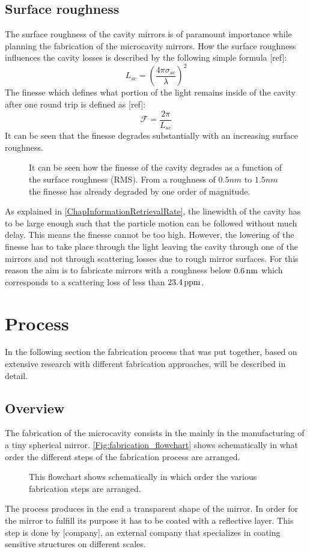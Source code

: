 \subsection{Surface roughness}
The surface roughness of the cavity mirrors is of paramount importance while planning the fabrication of the microcavity mirrors. How the surface roughness influences the cavity losses is described by the following simple formula [ref]:
\begin{equation}
	L_{\si{sc}}=\left(\frac{4\pi\sigma_{\si{sc}}}{\lambda}\right)^2
\end{equation}
The finesse which defines what portion of the light remains inside of the cavity after one round trip is defined as [ref]:
\begin{equation}
	\mathcal{F}=\frac{2\pi}{L_{\si{sc}}}
\end{equation}
It can be seen that the finesse degrades substantially with an increasing surface roughness.
\begin{figure}[H]
	
	\caption{It can be seen how the finesse of the cavity degrades as a function of the surface roughness (RMS). From a roughness of $0.5\si{nm}$ to $1.5\si{nm}$ the finesse has already degraded by one order of magnitude.}
\end{figure}
As explained in \autoref{ChapInformationRetrievalRate}, the linewidth of the cavity has to be large enough such that the particle motion can be followed without much delay. This means the finesse cannot be too high. However, the lowering of the finesse has to take place through the light leaving the cavity through one of the mirrors and not through scattering losses due to rough mirror surfaces. For this reason the aim is to fabricate mirrors with a roughness below $0.6\nm$ which corresponds to a scattering loss of less than $23.4\ppm$.
\newpage

\section{Process}
In the following section the fabrication process that was put together, based on extensive research with different fabrication approaches, will be described in detail.

\subsection{Overview}
The fabrication of the microcavity consists in the mainly in the manufacturing of a tiny spherical mirror. \autoref{Fig:fabrication_flowchart} shows schematically in what order the different steps of the fabrication process are arranged.
\begin{figure}[H]
	
	\caption{This flowchart shows schematically in which order the various fabrication steps are arranged.}
	\label{Fig:fabrication_flowchart}
\end{figure}
The process produces in the end a transparent shape of the mirror. In order for the mirror to fulfill its purpose it has to be coated with a reflective layer. This step is done by [company], an external company that specializes in coating sensitive structures on different scales.
